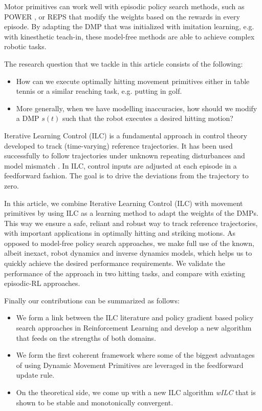 \documentclass[10pt,a4paper]{article}
\newcommand{\dmp}{s} %
\begin{document}
Motor primitives can work well with episodic policy search methods, such as POWER \cite{Kober08}, or REPS \cite{Peter10} that modify the weights based on the rewards in every episode. By adapting the DMP that was initialized with imitation learning, e.g. with kinesthetic teach-in, these model-free methods are able to achieve complex robotic tasks.

The research question that we tackle in this article consists of the following:

\begin{itemize}
\item How can we execute optimally hitting movement primitives either in table tennis or a similar reaching task, e.g. putting in golf.

\item More generally, when we have modelling inaccuracies, how should we modify a DMP $\dmp(t)$ such that the robot executes a desired hitting motion?
\end{itemize}

Iterative Learning Control (ILC) is a fundamental approach in control theory developed to track (time-varying) reference trajectories. It has been used successfully to follow trajectories under unknown repeating disturbances and model mismatch \cite{Bristow06}. In ILC, control inputs are adjusted at each episode in a feedforward fashion. The goal is to drive the deviations from the trajectory to zero. 

In this article, we combine Iterative Learning Control (ILC) with movement primitives by using ILC as a learning method to adapt the weights of the DMPs. This way we ensure a safe, reliant and robust way to track reference trajectories, with important applications in optimally hitting and striking motions. As opposed to model-free policy search approaches, we make full use of the known, albeit inexact, robot dynamics and inverse dynamics models, which helps us to quickly achieve the desired performance requirements. We validate the performance of the approach in two hitting tasks, and compare with existing episodic-RL approaches.

Finally our contributions can be summarized as follows:

\begin{itemize}
\item We form a link between the ILC literature and policy gradient based policy search approaches in Reinforcement Learning and develop a new algorithm that feeds on the strengths of both domains.

\item We form the first coherent framework where some of the biggest advantages of using Dynamic Movement Primitives are leveraged in the feedforward update rule.

\item On the theoretical side, we come up with a new ILC algorithm \emph{wILC} that is shown to be stable and monotonically convergent.

\end{itemize}
\end{document}
